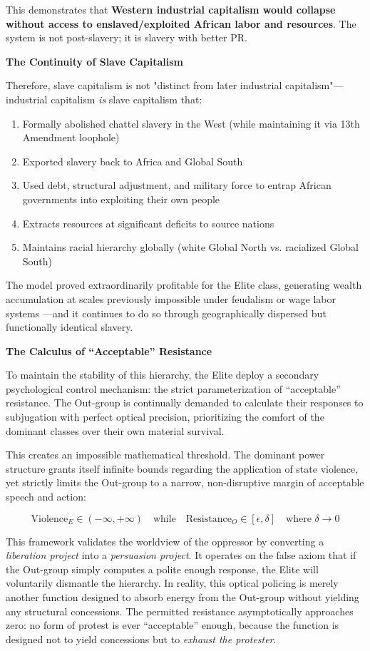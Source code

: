 \documentclass[12pt]{article}
\begin{document}
This demonstrates that \textbf{Western industrial capitalism would collapse without access to enslaved/exploited African labor and resources}. The system is not post-slavery; it is slavery with better PR.

\textbf{The Continuity of Slave Capitalism}

Therefore, slave capitalism is not "distinct from later industrial capitalism"---industrial capitalism \textit{is} slave capitalism that:
\begin{enumerate}
    \item Formally abolished chattel slavery in the West (while maintaining it via 13th Amendment loophole)
    \item Exported slavery back to Africa and Global South
    \item Used debt, structural adjustment, and military force to entrap African governments into exploiting their own people
    \item Extracts resources at significant deficits to source nations
    \item Maintains racial hierarchy globally (white Global North vs. racialized Global South)
\end{enumerate}

The model proved extraordinarily profitable for the Elite class, generating wealth accumulation at scales previously impossible under feudalism or wage labor systems \cite{williams, robinson}---and it continues to do so through geographically dispersed but functionally identical slavery.

\textbf{The Calculus of ``Acceptable'' Resistance}

To maintain the stability of this hierarchy, the Elite deploy a secondary psychological control mechanism: the strict parameterization of ``acceptable'' resistance. The Out-group is continually demanded to calculate their responses to subjugation with perfect optical precision, prioritizing the comfort of the dominant classes over their own material survival.

This creates an impossible mathematical threshold. The dominant power structure grants itself infinite bounds regarding the application of state violence, yet strictly limits the Out-group to a narrow, non-disruptive margin of acceptable speech and action:

\[
\text{Violence}_E \in (-\infty, +\infty) \quad \text{while} \quad \text{Resistance}_O \in [\epsilon, \delta] \quad \text{where } \delta \to 0
\]

This framework validates the worldview of the oppressor by converting a \textit{liberation project} into a \textit{persuasion project}. It operates on the false axiom that if the Out-group simply computes a polite enough response, the Elite will voluntarily dismantle the hierarchy. In reality, this optical policing is merely another function designed to absorb energy from the Out-group without yielding any structural concessions. The permitted resistance asymptotically approaches zero: no form of protest is ever ``acceptable'' enough, because the function is designed not to yield concessions but to \textit{exhaust the protester}.
\end{document}
